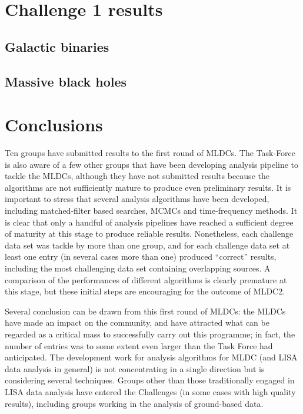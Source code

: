\documentclass[11pt]{article}
\begin{document}
\section{Challenge 1 results}

\subsection{Galactic binaries}

\subsection{Massive black holes}


\section{Conclusions}

Ten groups have submitted results to the first round of MLDCs. The Task-Force is also aware of a few other groups that have been developing analysis pipeline to tackle the MLDCs, although they have not submitted results because the algorithms are not sufficiently mature to produce even preliminary results. It is important to stress that several analysis algorithms have been developed, including matched-filter based searches, MCMCs and time-frequency methods. It is clear that only a handful of analysis pipelines have reached a sufficient degree of maturity at this stage to produce reliable results. Nonetheless, each challenge data set was tackle by more than one group, and for each challenge data set at least one entry (in several cases more than one) produced ``correct'' results, including the most challenging data set containing overlapping sources. A comparison of the performances of different algorithms is clearly premature at this stage, but these initial steps are encouraging for the outcome of MLDC2.

Several conclusion can be drawn from this first round of MLDCs: the MLDCs have made an impact on the community, and  have attracted what can be regarded as a critical mass to successfully carry out this programme; in fact, the number of entries was to some extent even larger than the Task Force had anticipated. The development work for analysis algorithms for MLDC (and LISA data analysis in general) is not concentrating in a single direction but is considering several techniques. Groups other than those traditionally engaged in LISA data analysis have entered the Challenges (in some cases with high quality results), including groups working in the analysis of ground-based data. 
\end{document}
